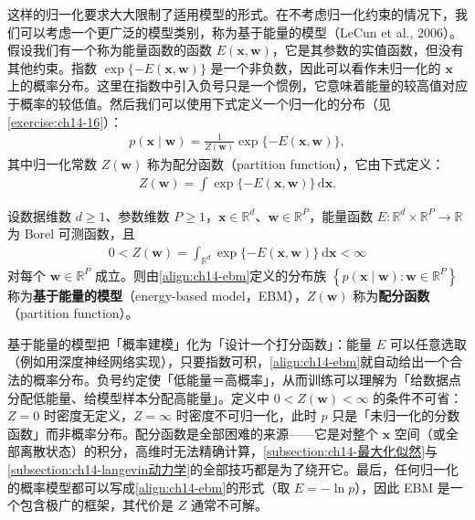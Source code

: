 \documentclass[../../main.tex]{subfiles}
\begin{document}
这样的归一化要求大大限制了适用模型的形式。在不考虑归一化约束的情况下，我们可以考虑一个更广泛的模型类别，称为基于能量的模型（LeCun et al., 2006）。假设我们有一个称为能量函数的函数 $E(\bm{x},\bm{w})$，它是其参数的实值函数，但没有其他约束。指数 $\exp\{-E(\bm{x},\bm{w})\}$ 是一个非负数，因此可以看作未归一化的 $\bm{x}$ 上的概率分布。这里在指数中引入负号只是一个惯例，它意味着能量的较高值对应于概率的较低值。然后我们可以使用下式定义一个归一化的分布（见\cref{exercise:ch14-16}）：
\begin{align}
p(\bm{x}\mid\bm{w})=\frac{1}{Z(\bm{w})}\exp\{-E(\bm{x},\bm{w})\},
\label{align:ch14-ebm}
\end{align}
其中归一化常数 $Z(\bm{w})$ 称为配分函数（partition function），它由下式定义：
\begin{align}
Z(\bm{w})=\int\exp\{-E(\bm{x},\bm{w})\}\,\mathrm{d}\bm{x}.
\label{align:ch14-partition}
\end{align}

\begin{definition}[基于能量的模型]\label{definition:ch14-基于能量模型}
设数据维数 $d\geqslant1$、参数维数 $P\geqslant1$，$\bm{x}\in\mathbb{R}^{d}$、$\bm{w}\in\mathbb{R}^{P}$，能量函数 $E:\mathbb{R}^{d}\times\mathbb{R}^{P}\to\mathbb{R}$ 为 Borel 可测函数，且
\begin{align*}
0<Z(\bm{w})=\int_{\mathbb{R}^{d}}\exp\{-E(\bm{x},\bm{w})\}\ \mathrm{d}\bm{x}<\infty
\end{align*}
对每个 $\bm{w}\in\mathbb{R}^{P}$ 成立。则由\eqref{align:ch14-ebm}定义的分布族 $\left\{p(\bm{x}\mid\bm{w}):\bm{w}\in\mathbb{R}^{P}\right\}$ 称为\textbf{基于能量的模型}（energy-based model，EBM），$Z(\bm{w})$ 称为\textbf{配分函数}（partition function）。
\end{definition}

\begin{remark}基于能量的模型把「概率建模」化为「设计一个打分函数」：能量 $E$ 可以任意选取（例如用深度神经网络实现），只要指数可积，\eqref{align:ch14-ebm}就自动给出一个合法的概率分布。负号约定使「低能量＝高概率」，从而训练可以理解为「给数据点分配低能量、给模型样本分配高能量」。定义中 $0<Z(\bm{w})<\infty$ 的条件不可省：$Z=0$ 时密度无定义，$Z=\infty$ 时密度不可归一化，此时 $p$ 只是「未归一化的分数函数」而非概率分布。配分函数是全部困难的来源——它是对整个 $\bm{x}$ 空间（或全部离散状态）的积分，高维时无法精确计算，\cref{subsection:ch14-最大化似然}与\cref{subsection:ch14-langevin动力学}的全部技巧都是为了绕开它。最后，任何归一化的概率模型都可以写成\eqref{align:ch14-ebm}的形式（取 $E=-\ln p$），因此 EBM 是一个包含极广的框架，其代价是 $Z$ 通常不可解。
\end{remark}
\end{document}
